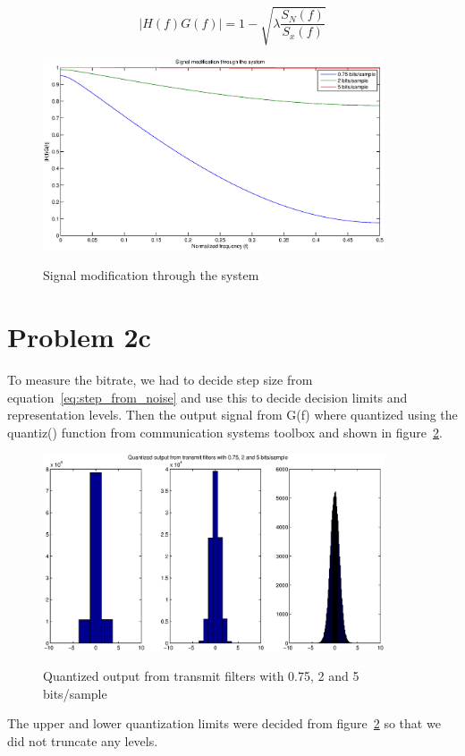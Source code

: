 	\begin{equation}
		|H(f)G(f)|=1-\sqrt{\lambda \frac{S_N(f)}{S_x(f)}}
		\label{eq:total_sig_mod}
	\end{equation}
	
	\begin{figure}[h]
	  \centering
	  \includegraphics[width=0.9\textwidth]{img/Oppgave2b_signal_mod_x_y}
	  \label{fig:signal_mod_xy}
	  \caption{Signal modification through the system}
	\end{figure}

\section{Problem 2c}
	
	To measure the bitrate, we had to decide step size from equation~\ref{eq:step_from_noise} and use this to decide decision limits and representation levels. Then the output signal from G(f) where quantized using the quantiz() function from communication systems toolbox and shown in figure~\ref{fig:Quant_output}.
	
	\begin{figure}[h]
		\centering
		\includegraphics[width=0.9\textwidth]{img/Oppgave2c_Quant_output}
		\label{fig:Quant_output}
		\caption{Quantized output from transmit filters with 0.75, 2 and 5 bits/sample}
	\end{figure}
	The upper and lower quantization limits were decided from figure~\ref{fig:Quant_output} so that we did not truncate any levels. 
	
